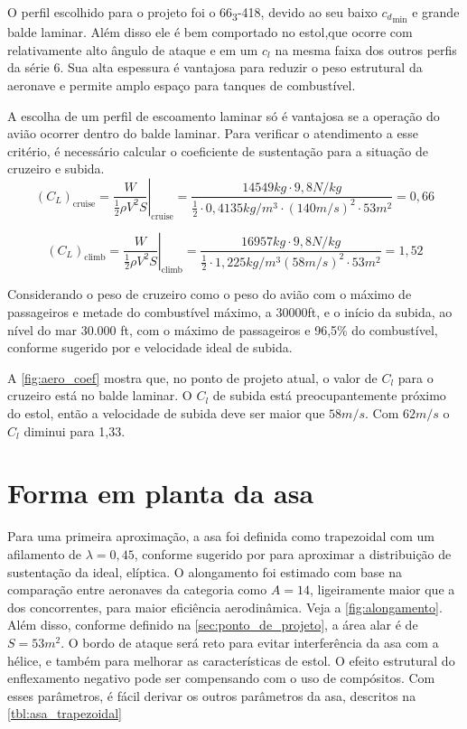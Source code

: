 O perfil escolhido para o projeto foi o 66\textsubscript{3}-418, devido ao seu baixo ${c_d}_{\min}$ e grande balde laminar. Além disso ele é bem comportado no estol,que ocorre com relativamente alto ângulo de ataque e em um $c_l$ na mesma faixa dos outros perfis da série 6. Sua alta espessura é vantajosa para reduzir o peso estrutural da aeronave e permite amplo espaço para tanques de combustível.

A escolha de um perfil de escoamento laminar só é vantajosa se a operação do avião ocorrer dentro do balde laminar. Para verificar o atendimento a esse critério, é necessário calcular o coeficiente de sustentação para a situação de cruzeiro e subida.
\begin{equation}
  (C_L)_{\text{cruise}} =
    \left.
      \frac {W} {\frac{1}{2} \rho V^2 S}
    \right|_{\text{cruise}} =
    \frac
      {14549\si{kg} \cdot 9,8\si{N/kg} }
      {\frac{1}{2} \cdot 0,4135 \si{kg/m^3} \cdot (140\si{m/s})^2 \cdot 53 \si{m^2}}
    = 0,66
\end{equation}

\begin{equation}
  (C_L)_{\text{climb}} =
    \left.\frac
      {W}
      {\frac{1}{2} \rho V^2 S}
    \right|_{\text{climb}} =
    \frac
      {16957\si{kg} \cdot 9,8\si{N/kg}}
      {\frac{1}{2} \cdot 1,225 \si{kg/m^3}
    (58\si{m/s})^2 \cdot 53 \si{m^2}}
    = 1,52
\end{equation}

Considerando o peso de cruzeiro como o peso do avião com o máximo de passageiros e metade do combustível máximo, a 30000ft, e o início da subida, ao nível do mar 30.000 \si{ft}, com o máximo de passageiros e 96,5\% do combustível, conforme sugerido por \cite{roskam} e velocidade ideal de subida.

A \autoref{fig:aero_coef} mostra que, no ponto de projeto atual, o valor de
$C_l$ para o cruzeiro está no balde laminar. O $C_l$ de subida está preocupantemente próximo do estol, então a velocidade de subida deve ser maior que $58\si{m/s}$. Com $62\si{m/s}$ o $C_l$ diminui para 1,33.

\section{Forma em planta da asa}
Para uma primeira aproximação, a asa foi definida como trapezoidal com um afilamento de $\lambda = 0,45$, conforme sugerido por \cite{raymer2012aircraft} para aproximar a distribuição de sustentação da ideal, elíptica. O alongamento foi estimado com base na comparação entre aeronaves da categoria como $A = 14$, ligeiramente maior que a dos concorrentes, para maior eficiência aerodinâmica. Veja a \autoref{fig:alongamento}. Além disso, conforme definido na \autoref{sec:ponto_de_projeto}, a área alar é de $S=53\si{m^2}$. O bordo de ataque será reto para evitar interferência da asa com a hélice, e também para melhorar as características de estol. O efeito estrutural do enflexamento negativo pode ser compensando com o uso de compósitos. Com esses parâmetros, é fácil derivar os outros parâmetros da asa, descritos na \autoref{tbl:asa_trapezoidal}

